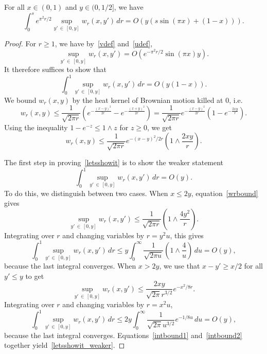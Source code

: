 \documentclass[AHL,Unicode,longabstracts,published]{cedram}
\newcommand{\1} {\mathds{1}}
\begin{document}
\begin{lemm}\label{lem:wintunif}
For all $x \in (0,1)$ and $y \in (0, 1/2]$, we have
\[
\int_0^s e^{\pi^2 r/2}\sup_{y'\,\in\,[0,y]} w_r(x,y')\,dr = O(y(s\sin(\pi x)+(1-x))).
\]
\end{lemm}

\begin{proof}
For $r \ge 1$, we have by~\eqref{vdef} and~\eqref{udef},
\begin{equation}\label{wlarges}
\sup_{y'\,\in\,[0,y]} w_r(x,y') = O(e^{-\pi^2 r/2}\sin(\pi x)y).
\end{equation}
It therefore suffices to show that
\begin{equation}\label{letsshowit}
\int_0^1 \sup_{y'\,\in\,[0,y]} w_r(x,y')\,dr = O(y(1-x)).
\end{equation}
We bound $w_r(x,y)$ by the heat kernel of Brownian motion killed at $0$, i.e.
\[
w_r(x,y) \le \frac 1 {\sqrt{2\pi r}} \left(e^{-\frac{(x-y)^2}{2r}} - e^{-\frac{(x+y)^2}{2r}}\right) = \frac 1 {\sqrt{2\pi r}} e^{-\frac{(x-y)^2}{2r}}(1-e^{-\frac{2xy}r}).
\]
Using the inequality $1 - e^{-z} \leq 1 \wedge z$ for $z \geq 0$, we get
\begin{equation}\label{wrbound}
w_r(x,y) \leq \frac{1}{\sqrt{2 \pi r}} e^{-(x - y)^2/2r} \left(1 \wedge \frac{2 x y}{r} \right).
\end{equation}

The first step in proving~\eqref{letsshowit} is to show the weaker statement
\begin{equation}\label{letsshowit_weaker}
\int_0^1 \sup_{y'\,\in\,[0,y]} w_r(x,y')\,dr = O(y).
\end{equation}
To do this, we distinguish between two cases. When $x \leq 2y$, equation~\eqref{wrbound} gives
\[
\sup_{y'\,\in\,[0,y]}w_r(x,y') \le \frac 1 {\sqrt{2\pi r}} \left(1\wedge \frac {4y^2}{r}\right).
\]
Integrating over $r$ and changing variables by $r = y^2 u$, this gives
\begin{equation}\label{intbound1}
\int_0^1 \sup_{y'\,\in\,[0,y]} w_r(x,y')\,dr \le y \int_0^\infty \frac 1 {\sqrt{2\pi u}} \left(1\wedge \frac {4}{u}\right)\,du = O(y),
\end{equation}
because the last integral converges. When $x > 2y$, we use that $x-y' \ge x/2$ for all $y'\le y$ to get
\[
\sup_{y'\,\in\,[0,y]} w_r(x,y') \le \frac {2xy} {\sqrt{2\pi}r^{3/2}} e^{-x^2/8r}.
\]
Integrating over $r$ and changing variables by $r = x^2 u$,
\begin{equation}\label{intbound2}
\int_0^1 \sup_{y'\,\in\,[0,y]} w_r(x,y')\,dr \le 2 y \int_0^\infty \frac 1 {\sqrt{2\pi} u^{3/2}} e^{-1/8u}\,du = O(y),
\end{equation}
because the last integral converges. Equations~\eqref{intbound1} and~\eqref{intbound2} together yield~\eqref{letsshowit_weaker}.


\end{proof}
\end{document}
